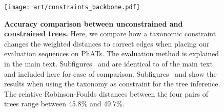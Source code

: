 

\begin{figure}[hpbt]
    \centering
    \texttt{[image: art/constraints\_backbone.pdf]}
    \begin{subfigure}{0pt}
        \label{fig:constraints_backbone:sub:edge_unconstr}
    \end{subfigure}
    \begin{subfigure}{0pt}
        \label{fig:constraints_backbone:sub:edge_constr}
    \end{subfigure}
    \begin{subfigure}{0pt}
        \label{fig:constraints_backbone:sub:branch_unconstr}
    \end{subfigure}
    \begin{subfigure}{0pt}
        \label{fig:constraints_backbone:sub:branch_constr}
    \end{subfigure}
    \caption[Accuracy comparison between unconstrained and constrained trees]{
        \textbf{Accuracy comparison between unconstrained and constrained trees.}
        Here, we compare how a taxonomic constraint changes the weighted distances to correct edges
        when placing our evaluation sequences on \acp{PhAT}.
        The evaluation method is explained in the main text.
        Subfigures~
        and  are identical to
         of the main text and included here for ease of comparison.
        Subfigures~
        and  show the results when using the
         taxonomy as constraint for the tree inference.
        The relative Robinson-Foulds distances \citep{Robinson1981}
        between the four pairs of trees range between \num{45.8}\% and \num{49.7}\%.
}
\end{figure}
